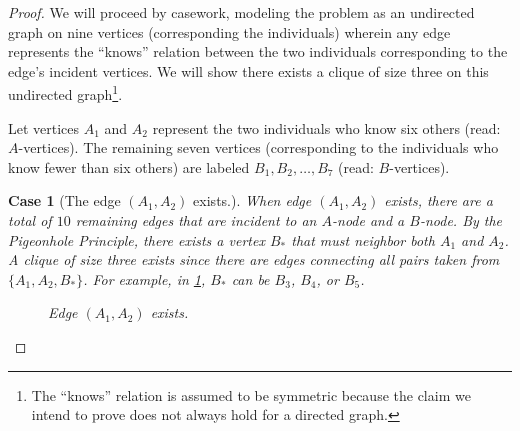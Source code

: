 \documentclass{article}
\newtheorem{case}{Case}
\numberwithin{subcase}{case}
\begin{document}
\begin{proof}

We will proceed by casework, modeling the problem as an undirected graph on nine vertices (corresponding the individuals) wherein any edge represents the ``knows'' relation between the two individuals corresponding to the edge's incident vertices. We will show there exists a clique of size three on this undirected graph\footnote{The ``knows'' relation is assumed to be symmetric because the claim we intend to prove does not always hold for a directed graph.}.

Let vertices $A_{1}$ and $A_{2}$ represent the two individuals who know six others (read: $A$-vertices). The remaining seven vertices (corresponding to the individuals who know fewer than six others) are labeled $B_{1}, B_{2}, \ldots, B_{7}$  (read: $B$-vertices).

\begin{case}[The edge $(A_{1}, A_{2})$ exists.]

    When edge $(A_{1}, A_{2})$ exists, there are a total of $10$ remaining edges that are incident to an $A$-node and a $B$-node. By the Pigeonhole Principle, there exists a vertex $B_{*}$ that must neighbor both $A_{1}$ and $A_{2}$. A clique of size three exists since there are edges connecting all pairs taken from $\lbrace A_{1}, A_{2}, B_{*} \rbrace$. For example, in \cref{fig:case_1}, $B_{*}$ can be $B_{3}$, $B_{4}$, or $B_{5}$.

    \begin{figure}[H]
        \centering
    \caption{Edge $(A_{1}, A_{2})$ exists.}
    \label{fig:case_1}
    \end{figure}


\end{case}
\end{proof}
\end{document}
